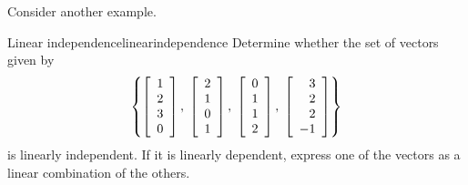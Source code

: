 Consider another example.

\begin{example}{Linear independence}{linearindependence}
Determine whether the set of vectors given by  
\[\left\{ 
\left[
\begin{array}{r}
1 \\
2 \\
3 \\
0
\end{array}
\right], \; \left[
\begin{array}{r}
2 \\
1 \\
0 \\
1
\end{array}
\right], \; \left[
\begin{array}{r}
0 \\
1 \\
1 \\
2
\end{array}
\right], \; \left[
\begin{array}{r}
3 \\
2 \\
2 \\
-1
\end{array}
\right] \right\} \]
is linearly independent. If it is linearly dependent,
express one of the vectors as a linear combination of the others.
\end{example}

